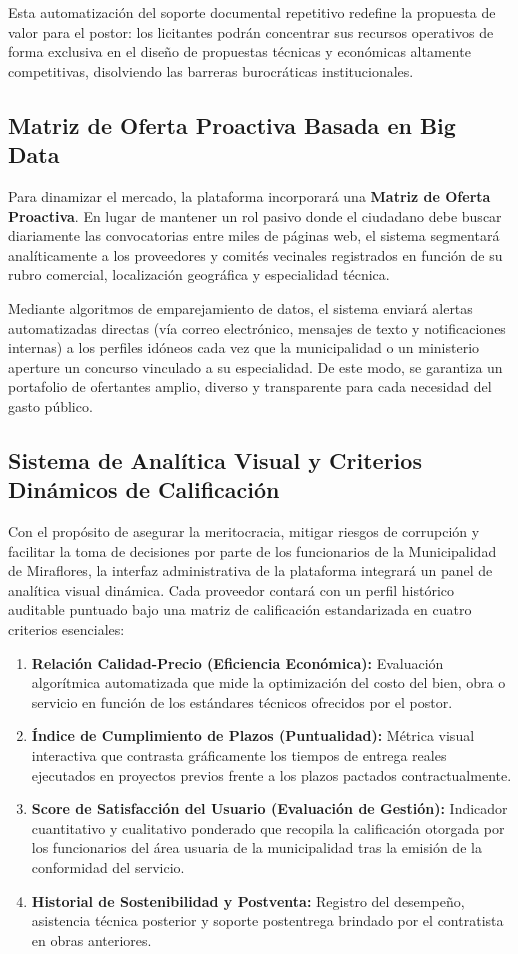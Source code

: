 \documentclass[12pt,a4paper]{article}
\begin{document}
Esta automatización del soporte documental repetitivo redefine la propuesta de valor para el postor: los licitantes podrán concentrar sus recursos operativos de forma exclusiva en el diseño de propuestas técnicas y económicas altamente competitivas, disolviendo las barreras burocráticas institucionales.

\subsection{ Matriz de Oferta Proactiva Basada en Big Data}
Para dinamizar el mercado, la plataforma incorporará una \textbf{Matriz de Oferta Proactiva}. En lugar de mantener un rol pasivo donde el ciudadano debe buscar diariamente las convocatorias entre miles de páginas web, el sistema segmentará analíticamente a los proveedores y comités vecinales registrados en función de su rubro comercial, localización geográfica y especialidad técnica.

Mediante algoritmos de emparejamiento de datos, el sistema enviará alertas automatizadas directas (vía correo electrónico, mensajes de texto y notificaciones internas) a los perfiles idóneos cada vez que la municipalidad o un ministerio aperture un concurso vinculado a su especialidad. De este modo, se garantiza un portafolio de ofertantes amplio, diverso y transparente para cada necesidad del gasto público.

\subsection{ Sistema de Analítica Visual y Criterios Dinámicos de Calificación}
Con el propósito de asegurar la meritocracia, mitigar riesgos de corrupción y facilitar la toma de decisiones por parte de los funcionarios de la Municipalidad de Miraflores, la interfaz administrativa de la plataforma integrará un panel de analítica visual dinámica. Cada proveedor contará con un perfil histórico auditable puntuado bajo una matriz de calificación estandarizada en cuatro criterios esenciales:
\begin{enumerate}
    \item \textbf{Relación Calidad-Precio (Eficiencia Económica):} Evaluación algorítmica automatizada que mide la optimización del costo del bien, obra o servicio en función de los estándares técnicos ofrecidos por el postor.
    \item \textbf{Índice de Cumplimiento de Plazos (Puntualidad):} Métrica visual interactiva que contrasta gráficamente los tiempos de entrega reales ejecutados en proyectos previos frente a los plazos pactados contractualmente.
    \item \textbf{Score de Satisfacción del Usuario (Evaluación de Gestión):} Indicador cuantitativo y cualitativo ponderado que recopila la calificación otorgada por los funcionarios del área usuaria de la municipalidad tras la emisión de la conformidad del servicio.
    \item \textbf{Historial de Sostenibilidad y Postventa:} Registro del desempeño, asistencia técnica posterior y soporte postentrega brindado por el contratista en obras anteriores.
\end{enumerate}
\end{document}
